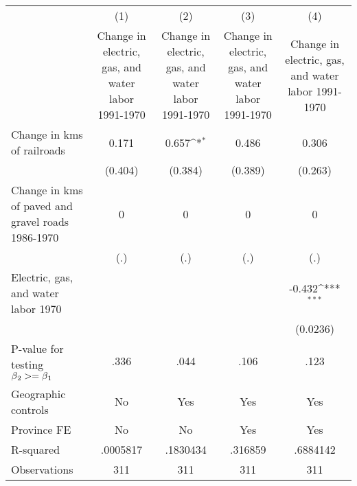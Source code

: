 {
\def\sym#1{\ifmmode^{#1}\else\(^{#1}\)\fi}
\begin{tabular}{l*{4}{c}}
\hline\hline
                &\multicolumn{1}{c}{(1)}&\multicolumn{1}{c}{(2)}&\multicolumn{1}{c}{(3)}&\multicolumn{1}{c}{(4)}\\
                &\multicolumn{1}{c}{Change in electric, gas, and water labor 1991-1970}&\multicolumn{1}{c}{Change in electric, gas, and water labor 1991-1970}&\multicolumn{1}{c}{Change in electric, gas, and water labor 1991-1970}&\multicolumn{1}{c}{Change in electric, gas, and water labor 1991-1970}\\
\hline
Change in kms of railroads&    0.171         &    0.657\sym{*}  &    0.486         &    0.306         \\
                &  (0.404)         &  (0.384)         &  (0.389)         &  (0.263)         \\
[1em]
Change in kms of paved and gravel roads 1986-1970&        0         &        0         &        0         &        0         \\
                &      (.)         &      (.)         &      (.)         &      (.)         \\
[1em]
Electric, gas, and water labor 1970&                  &                  &                  &   -0.432\sym{***}\\
                &                  &                  &                  & (0.0236)         \\
\hline
P-value for testing $\beta\\_2 >= \beta\\_1$&     .336         &     .044         &     .106         &     .123         \\
Geographic controls&       No         &      Yes         &      Yes         &      Yes         \\
Province FE     &       No         &       No         &      Yes         &      Yes         \\
R-squared       & .0005817         & .1830434         &  .316859         & .6884142         \\
Observations    &      311         &      311         &      311         &      311         \\
\hline\hline
\end{tabular}
}
